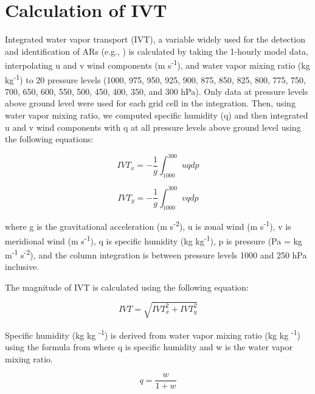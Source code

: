 \documentclass[draft]{agujournal2019}
\begin{document}
\section{Calculation of IVT}    %
\label{appendix:ivt}
Integrated water vapor transport (IVT), a variable widely used for the detection and identification of ARs (e.g., ) is calculated by taking the 1-hourly model data, interpolating u and v wind components (m s\textsuperscript{-1}), and water vapor mixing ratio (kg kg\textsuperscript{-1}) to 20 pressure levels (1000, 975, 950, 925, 900, 875, 850, 825, 800, 775, 750, 700, 650, 600, 550, 500, 450, 400, 350, and 300 hPa). Only data at pressure levels above ground level were used for each grid cell in the integration. Then, using water vapor mixing ratio, we computed specific humidity (q) and then integrated u and v wind components with q at all pressure levels above ground level using the following equations:

\begin{equation}
IVT_{x} = -\frac{1}{g} \int_{1000}^{300} u q dp
\end{equation}

\begin{equation}
IVT_{y} = -\frac{1}{g} \int_{1000}^{300} v q dp
\end{equation}

where g is the gravitational acceleration (m s\textsuperscript{-2}), u is zonal wind (m s\textsuperscript{-1}), v is meridional wind (m s\textsuperscript{-1}), q is specific humidity (kg kg\textsuperscript{-1}), p is pressure (Pa = kg m\textsuperscript{-1} s\textsuperscript{-2}), and the column integration is between pressure levels 1000 and 250 hPa inclusive.

The magnitude of IVT is calculated using the following equation:

\begin{equation}
IVT = \sqrt{IVT_{x}^2 + IVT_{y}^2}
\end{equation}

Specific humidity (kg kg \textsuperscript{-1}) is derived from water vapor mixing ratio (kg kg \textsuperscript{-1}) using the formula from \cite{Wallace2006} where q is specific humidity and w is the water vapor mixing ratio.

\begin{equation}
q = \frac{w}{1 + w}
\end{equation}

\end{document}
